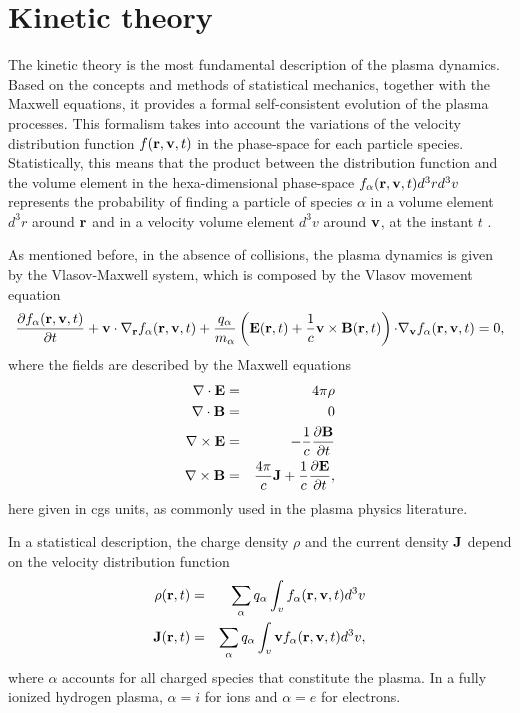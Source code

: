 \documentclass[12pt,a4paper,ruledheader]{report}
\begin{document}
\chapter{Kinetic theory}
\label{cha:kin-theo}
The kinetic theory is the most fundamental description of the
plasma dynamics. Based on the concepts and methods of statistical
mechanics, together with the Maxwell equations, it provides a
formal self-consistent evolution of the plasma processes. This
formalism takes into account the variations of the velocity
distribution function $f({\bf r},{\bf v},t)$ in the phase-space
for each particle species. Statistically, this means that the
product between the distribution function and the volume element
in the hexa-dimensional phase-space $f_\alpha({\bf r},{\bf v},t)d^3r d^3v$
represents the probability of finding a particle of species
$\alpha$ in a volume element $d^3r$ around ${\bf r}$ and in a
velocity volume element $d^3v$ around ${\bf v}$, at the instant
$t$ \cite{klimo,klimon}.

As mentioned before, in the absence of collisions, the plasma
dynamics is given by the Vlasov-Maxwell system, which is composed
by the Vlasov movement equation
\begin{equation}
  \label{eq:vlasov}
  \frac{\partial f_{\alpha}({\bf r},{\bf v},t)}{\partial t}
  +{\bf v \cdot \nabla_r}f_{\alpha}({\bf r},{\bf v},t)
  +\frac{q_{\alpha}}{m_{\alpha}}
  \left({\bf E}({\bf r},t)+\frac{1}{c}{\bf v}\times {\bf B}({\bf r},t) \right)
  {\bf \cdot \nabla_v}f_{\alpha}({\bf r},{\bf v},t)=0,
\end{equation}
where the fields are described by the Maxwell equations
\begin{eqnarray}
  \label{max1}
  {\bf \nabla \cdot E}&=& 4\pi\rho\\
  \label{max2}
  {\bf \nabla \cdot B}&=& 0\\
  \label{max3}
    {\bf \nabla \times E}&=& -\frac{1}{c}
   \frac{\partial \bf B}{\partial t}\\
  \label{max4}
    {\bf \nabla \times B}&=& \frac{4\pi}{c}{\bf J}
    +\frac{1}{c}\frac{\partial{\bf E}}{\partial t},
\end{eqnarray}
here given in cgs units, as commonly used in the
plasma physics literature.


In a statistical description, the charge density $\rho$
and the current density ${\bf J}$ depend on the velocity
distribution function
\begin{eqnarray}
  \label{qdensity}
    \rho({\bf r},t)
  &=&\sum_{\alpha}q_{\alpha}\int_v
    f_{\alpha}({\bf r},{\bf v},t)d^3v\\
\label{jdensity}
  {\bf J}({\bf r},t)
  &=&\sum_{\alpha}q_{\alpha}\int_v{\bf v}
  f_{\alpha}({\bf r},{\bf v},t) d^3v,
\end{eqnarray}
where $\alpha$ accounts for all charged species that constitute
the plasma. In a fully ionized hydrogen plasma, $\alpha=i$ for
ions and $\alpha=e$ for electrons.
\end{document}
